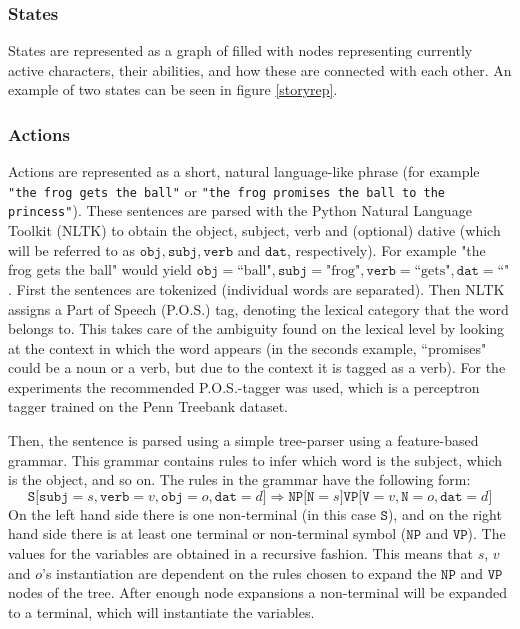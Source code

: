 \subsubsection{States}

States are represented as a graph of filled with nodes representing currently
active characters, their abilities, and how these are connected with each other.
An example of two states can be seen in figure \ref{storyrep}.

\subsubsection{Actions}

Actions are represented as a short, natural language-like phrase (for example 
\texttt{"the frog gets the ball"}
or \texttt{"the frog promises the ball to the princess"}).
These sentences are parsed with the Python Natural Language Toolkit (NLTK)
to obtain the object, subject, verb and (optional) dative (which will be
referred to as $\texttt{obj}, \texttt{subj}, \texttt{verb}$ and $\texttt{dat}$,
respectively). For example "the frog gets the ball" would yield 
$\texttt{obj}=\textrm{``ball"}, \texttt{subj}=\textrm{"frog"},
\texttt{verb}=\textrm{``gets"}, \texttt{dat}=\textrm{``"} $. First the
sentences are tokenized (individual words are separated). Then NLTK assigns a
Part of Speech (P.O.S.) tag, denoting the lexical category that the word belongs
to. This takes care of the ambiguity found on the lexical level by looking at
the context in which the word appears (in the seconds example, ``promises" could
be a noun or a verb, but due to the context it is tagged as a verb). For the
experiments the recommended P.O.S.-tagger was used, which is a perceptron tagger
trained on the Penn Treebank dataset.

Then, the sentence is parsed using a simple tree-parser using a feature-based
grammar. This grammar contains rules to infer which word is the subject, which
is the object, and so on. The rules in the grammar have the following form:
$$
\texttt{S}{[}\texttt{subj}=s, \texttt{verb}=v, \texttt{obj}=o, \texttt{dat}=d{]}
\Rightarrow
\texttt{NP}{[}\texttt{N}=s{]} \texttt{VP}{[}\texttt{V}=v, \texttt{N}=o,
\texttt{dat}=d{]}
$$
On the left hand side there is one non-terminal (in this case $\texttt{S}$), and
on the right hand side there is at least one terminal or non-terminal symbol
($\texttt{NP}$ and $\texttt{VP}$). The values for the variables are obtained in
a recursive fashion. This means that $s$, $v$ and $o$'s instantiation are dependent on the rules
chosen to expand the $\texttt{NP}$ and $\texttt{VP}$ nodes of the tree. After
enough node expansions a non-terminal will be expanded to a terminal, which will
instantiate the variables.

